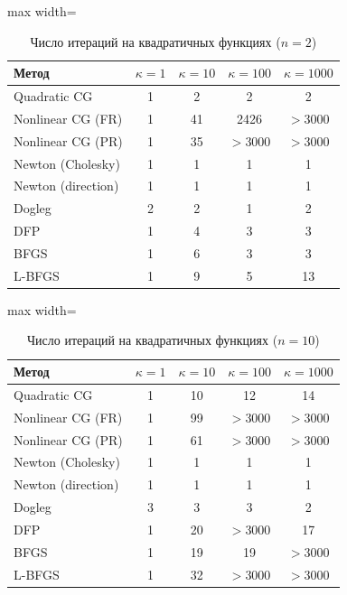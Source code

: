 \documentclass[12pt]{article}
\begin{document}
\begin{table}[H]
\centering
\caption{Число итераций на квадратичных функциях ($n=2$)}
\begin{adjustbox}{max width=\textwidth}
\begin{tabular}{lcccc}
\toprule
\textbf{Метод} & $\kappa=1$ & $\kappa=10$ & $\kappa=100$ & $\kappa=1000$ \\
\midrule
Quadratic CG        & 1 & 2  & 2    & 2    \\
Nonlinear CG (FR)   & 1 & 41 & 2426 & $>$3000 \\
Nonlinear CG (PR)   & 1 & 35 & $>$3000 & $>$3000 \\
Newton (Cholesky)   & 1 & 1  & 1    & 1    \\
Newton (direction)  & 1 & 1  & 1    & 1    \\
Dogleg              & 2 & 2  & 1    & 2    \\
DFP                 & 1 & 4  & 3    & 3    \\
BFGS                & 1 & 6  & 3    & 3    \\
L-BFGS              & 1 & 9  & 5    & 13   \\
\bottomrule
\end{tabular}
\end{adjustbox}
\end{table}

\begin{table}[H]
\centering
\caption{Число итераций на квадратичных функциях ($n=10$)}
\begin{adjustbox}{max width=\textwidth}
\begin{tabular}{lcccc}
\toprule
\textbf{Метод} & $\kappa=1$ & $\kappa=10$ & $\kappa=100$ & $\kappa=1000$ \\
\midrule
Quadratic CG        & 1  & 10 & 12   & 14    \\
Nonlinear CG (FR)   & 1  & 99 & $>$3000 & $>$3000 \\
Nonlinear CG (PR)   & 1  & 61 & $>$3000 & $>$3000 \\
Newton (Cholesky)   & 1  & 1  & 1    & 1     \\
Newton (direction)  & 1  & 1  & 1    & 1     \\
Dogleg              & 3  & 3  & 3    & 2     \\
DFP                 & 1  & 20 & $>$3000 & 17    \\
BFGS                & 1  & 19 & 19   & $>$3000 \\
L-BFGS              & 1  & 32 & $>$3000 & $>$3000 \\
\bottomrule
\end{tabular}
\end{adjustbox}
\end{table}
\end{document}
